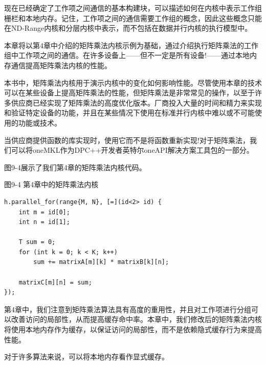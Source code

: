 现在已经确定了工作项之间通信的基本构建块，可以描述如何在内核中表示工作组栅栏和本地内存。记住，工作项之间的通信需要工作组的概念，因此这些概念只能在ND-Range内核和分层内核中表示，而不包括在数据并行内核的执行模型中。\par

本章将以第4章中介绍的矩阵乘法内核示例为基础，通过介绍执行矩阵乘法的工作组中工作项之间的通信。在许多设备上——但不一定是所有设备!——通过本地内存通信提高矩阵乘法内核的性能。\par

\begin{tcolorbox}[colback=blue!5!white,colframe=blue!75!black, title=关于矩阵乘法的注意事项]
本书中，矩阵乘法内核用于演示内核中的变化如何影响性能。尽管使用本章的技术可以在某些设备上提高矩阵乘法的性能，但矩阵乘法是非常常见的操作，以至于许多供应商已经实现了矩阵乘法的高度优化版本。厂商投入大量的时间和精力来实现和验证特定设备的功能，并且在某些情况下使用在标准并行内核中难以或不可能使用的功能或技术。
\end{tcolorbox}

\begin{tcolorbox}[colback=blue!5!white,colframe=blue!75!black, title=USE VENDOR-PROVIDED LIBRARIES!]
当供应商提供函数的库实现时，使用它而不是将函数重新实现!对于矩阵乘法，我们可以将oneMKL作为DPC++开发者英特尔oneAPI解决方案工具包的一部分。
\end{tcolorbox}

图9-4展示了我们第4章的矩阵乘法内核代码。\par

\hspace*{\fill} \par %
图9-4 第4章中的矩阵乘法内核
\begin{lstlisting}[caption={}]
h.parallel_for(range{M, N}, [=](id<2> id) {
	int m = id[0];
	int n = id[1];
	
	T sum = 0;
	for (int k = 0; k < K; k++)
		sum += matrixA[m][k] * matrixB[k][n];
		
	matrixC[m][n] = sum;
});
\end{lstlisting}

第4章中，我们注意到矩阵乘法算法具有高度的重用性，并且对工作项进行分组可以改善访问的局部性，从而提高缓存命中率。本章中，我们修改后的矩阵乘法内核将使用本地内存作为缓存，以保证访问的局部性，而不是依赖隐式缓存行为来提高性能。\par

\begin{tcolorbox}[colback=red!5!white,colframe=red!75!black]
对于许多算法来说，可以将本地内存看作显式缓存。
\end{tcolorbox}

